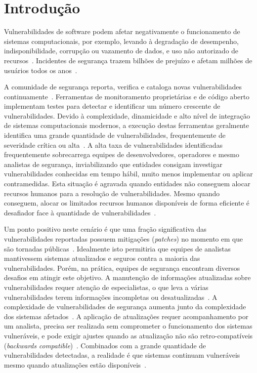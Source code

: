
\section{Introdução}\label{sec:intro}

Vulnerabilidades de software podem afetar negativamente o funcionamento de sistemas computacionais, por exemplo, levando à degradação de desempenho, indisponibilidade, corrupção ou vazamento de dados, e uso não autorizado de recursos~\cite{ghaffarian17vulnsurvey, gonzalez19vuln}.
Incidentes de segurança trazem bilhões de prejuízo e afetam milhões de usuários todos os anos~\cite{gartner18forecast, gartner18forecast, zscaler23report, alanazi2023scada, defense16ukraine, hill18heist}.

A comunidade de segurança reporta, verifica e cataloga novas vulnerabilidades continuamente~\cite{smyth17vuln}. Ferramentas de monitoramento proprietárias e de código aberto implementam testes para detectar e identificar um número crescente de vulnerabilidades. Devido à complexidade, dinamicidade e alto nível de integração de sistemas computacionais modernos, a execução destas ferramentas geralmente identifica uma grande quantidade de vulnerabilidades, frequentemente de severidade crítica ou alta~\cite{smyth17vuln}. A alta taxa de vulnerabilidades identificadas frequentemente sobrecarrega equipes de desenvolvedores, operadores e mesmo analistas de segurança, inviabilizando que entidades consigam investigar vulnerabilidades conhecidas em tempo hábil, muito menos implementar ou aplicar contramedidas. Esta situação é agravada quando entidades não conseguem alocar recursos humanos para a resolução de vulnerabilidades. Mesmo quando conseguem, alocar os limitados recursos humanos disponíveis de forma eficiente é desafiador face à quantidade de vulnerabilidades~\cite{ethembabaoglu2024unpatchables, smale23firehose}.

Um ponto positivo neste cenário é que uma fração significativa das vulnerabilidades reportadas possuem mitigações (\emph{patches}) no momento em que são tornadas públicas~\cite{smyth17vuln}. Idealmente isto permitiria que equipes de analistas mantivessem sistemas atualizados e seguros contra a maioria das vulnerabilidades. Porém, na prática, equipes de segurança encontram diversos desafios em atingir este objetivo. A manutenção de informações atualizadas sobre vulnerabilidades requer atenção de especialistas, o que leva a várias vulnerabilidades terem informações incompletas ou desatualizadas~\cite{gonzalez19vuln}. A complexidade de vulnerabilidades de segurança aumenta junto da complexidade dos sistemas afetados~\cite{le2021survey}. A aplicação de atualizações requer acompanhamento por um analista, precisa ser realizada sem comprometer o funcionamento dos sistemas vulneráveis, e pode exigir ajustes quando as atualização não são retro-compatíveis (\emph{backwards compatible})~\cite{panesar23iot, thomas2020catch}. Combinados com a grande quantidade de vulnerabilidades detectadas, a realidade é que sistemas continuam vulneráveis mesmo quando atualizações estão disponíveis~\cite{spring2023analysis, ethembabaoglu2024unpatchables, smale23firehose}.

